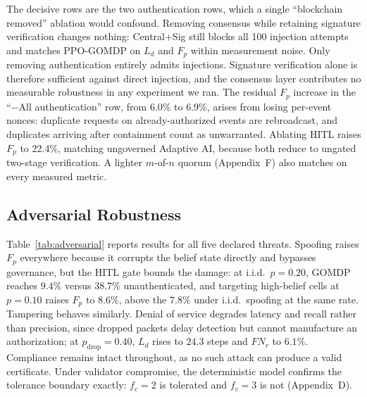 \documentclass[letterpaper]{article} %
\newcommand{\appByzantine}{D}
\newcommand{\appMultisig}{F}
\begin{document}
The decisive rows are the two authentication rows, which a single ``blockchain removed'' ablation would confound. Removing consensus while retaining signature verification changes nothing: Central+Sig still blocks all 100 injection attempts and matches PPO-GOMDP on $L_d$ and $F_p$ within measurement noise. Only removing authentication entirely admits injections. Signature verification alone is therefore sufficient against direct injection, and the consensus layer contributes no measurable robustness in any experiment we ran. The residual $F_p$ increase in the ``$-$All authentication'' row, from 6.0\% to 6.9\%, arises from losing per-event nonces: duplicate requests on already-authorized events are rebroadcast, and duplicates arriving after containment count as unwarranted. Ablating HITL raises $F_p$ to 22.4\%, matching ungoverned Adaptive AI, because both reduce to ungated two-stage verification. A lighter $m$-of-$n$ quorum (Appendix~\appMultisig) also matches on every measured metric.

\subsection{Adversarial Robustness}
\label{sec:robustness}

Table~\ref{tab:adversarial} reports results for all five declared threats. Spoofing raises $F_p$ everywhere because it corrupts the belief state directly and bypasses governance, but the HITL gate bounds the damage: at i.i.d.\ $p=0.20$, GOMDP reaches $9.4\%$ versus $38.7\%$ unauthenticated, and targeting high-belief cells at $p=0.10$ raises $F_p$ to $8.6\%$, above the $7.8\%$ under i.i.d.\ spoofing at the same rate. Tampering behaves similarly. Denial of service degrades latency and recall rather than precision, since dropped packets delay detection but cannot manufacture an authorization; at $p_{\mathrm{drop}}=0.40$, $L_d$ rises to $24.3$ steps and $FN_r$ to $6.1\%$. Compliance remains intact throughout, as no such attack can produce a valid certificate. Under validator compromise, the deterministic model confirms the tolerance boundary exactly: $f_c=2$ is tolerated and $f_c=3$ is not (Appendix~\appByzantine).
\end{document}

